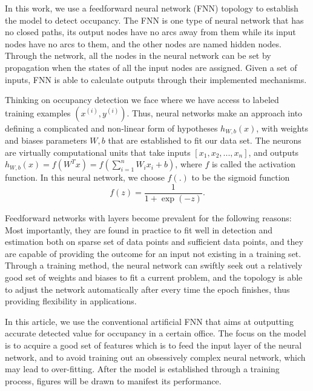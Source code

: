 In this work, we use a feedforward neural network (FNN) topology to establish the model to detect occupancy. The FNN is one type of neural network that has no closed paths, its output nodes have no arcs away from them while its input nodes have no arcs to them, and the other nodes are named hidden nodes. Through the network, all the nodes in the neural network can be set by propagation when the states of all the input nodes are assigned. Given a set of inputs, FNN is able to calculate outputs through their implemented mechanisms.

Thinking on occupancy detection we face where we have access to labeled training examples $\left( {{x^{\left( i \right)}},{y^{\left( i \right)}}} \right)$. Thus, neural networks make an approach into defining a complicated and non-linear form of hypotheses ${h_{W,b}}\left( x \right)$, with weights and biases parameters $W,b$ that are established to fit our data set. The neurons are virtually computational units that take inputs $[{x_1},{x_2},...,{x_n}]$, and outputs ${h_{W,b}}\left( x \right) = f\left( {{W^T}x} \right) = f\left( {\sum\nolimits_{i = 1}^n {{W_i}{x_i} + b} } \right)$, where $f$ is called the activation function. In this neural network, we choose $f\left( . \right)$ to be the sigmoid function
\[f\left( z \right) = \frac{1}{{1 + \exp \left( { - z} \right)}}.\]

Feedforward networks with layers become prevalent for the following reasons: Most importantly, they are found in practice to fit well in detection and estimation both on sparse set of data points and sufficient data points, and they are capable of providing the outcome for an input not existing in a training set. Through a training method, the neural network can swiftly seek out a relatively good set of weights and biases to fit a current problem, and the topology is able to adjust the network automatically after every time the epoch finishes, thus providing flexibility in applications.

In this article, we use the conventional artificial FNN that aims at outputting accurate detected value for occupancy in a certain office. The focus on the model is to acquire a good set of features which is to feed the input layer of the neural network, and to avoid training out an obsessively complex neural network, which may lead to over-fitting. After the model is established through a training process, figures will be drawn to manifest its performance.
